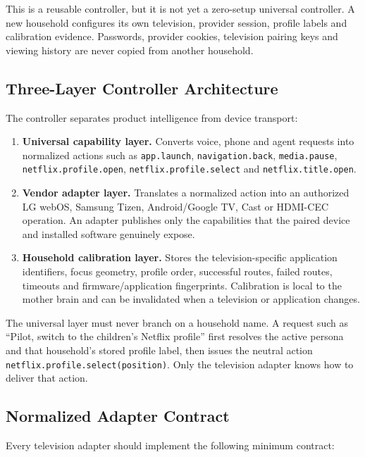 This is a reusable controller, but it is not yet a zero-setup universal
controller. A new household configures its own television, provider session,
profile labels and calibration evidence. Passwords, provider cookies, television
pairing keys and viewing history are never copied from another household.

\subsection{Three-Layer Controller Architecture}

The controller separates product intelligence from device transport:

\begin{enumerate}
  \item \textbf{Universal capability layer.} Converts voice, phone and agent
        requests into normalized actions such as \texttt{app.launch},
        \texttt{navigation.back}, \texttt{media.pause},
        \texttt{netflix.profile.open}, \texttt{netflix.profile.select} and
        \texttt{netflix.title.open}.
  \item \textbf{Vendor adapter layer.} Translates a normalized action into an
        authorized LG webOS, Samsung Tizen, Android/Google TV, Cast or HDMI-CEC
        operation. An adapter publishes only the capabilities that the paired
        device and installed software genuinely expose.
  \item \textbf{Household calibration layer.} Stores the television-specific
        application identifiers, focus geometry, profile order, successful
        routes, failed routes, timeouts and firmware/application fingerprints.
        Calibration is local to the mother brain and can be invalidated when a
        television or application changes.
\end{enumerate}

The universal layer must never branch on a household name. A request such as
``Pilot, switch to the children's Netflix profile'' first resolves the active
persona and that household's stored profile label, then issues the neutral action
\texttt{netflix.profile.select(position)}. Only the television adapter knows how
to deliver that action.

\subsection{Normalized Adapter Contract}

Every television adapter should implement the following minimum contract:

